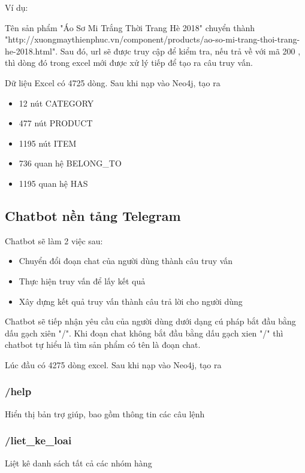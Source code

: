 Ví dụ: 

Tên sản phẩm "Áo Sơ Mi Trắng Thời Trang Hè 2018" chuyển thành "http://xuongmaythienphuc.vn/component/products/ao-so-mi-trang-thoi-trang-he-2018.html". Sau đó, url sẽ được truy cập để kiểm tra, nếu trả về với mã 200 , thì dòng đó trong excel mới được xử lý tiếp để tạo ra câu truy vấn. 

Dữ liệu Excel có 4725 dòng. Sau khi nạp vào Neo4j, tạo ra 

\begin{itemize}
\item 12 nút CATEGORY 
\item 477 nút PRODUCT 
\item 1195 nút ITEM 
\item 736 quan hệ BELONG\_TO 
\item 1195 quan hệ HAS 
\end{itemize}



\subsection{Chatbot nền tảng Telegram}

Chatbot sẽ làm 2 việc sau: 

\begin{itemize}
\item Chuyển đổi đoạn chat của người dùng thành câu truy vấn 
\item Thực hiện truy vấn để lấy kết quả 
\item Xây dựng kết quả truy vấn thành câu trả lời cho người dùng 
\end{itemize}

Chatbot sẽ tiếp nhận yêu cầu của người dùng dưới dạng cú pháp bắt đầu bằng dấu gạch xiên "/". Khi đoạn chat không bắt đầu bằng dấu gạch xien "/" thì chatbot tự hiểu là tìm sản phẩm có tên là đoạn chat.

Lúc đầu có 4275 dòng excel. Sau khi nạp vào Neo4j, tạo ra 

\subsubsection{/help} 
Hiển thị bản trợ giúp, bao gồm thông tin các câu lệnh

\subsubsection{/liet\_ke\_loai}
Liệt kê danh sách tất cả các nhóm hàng 

